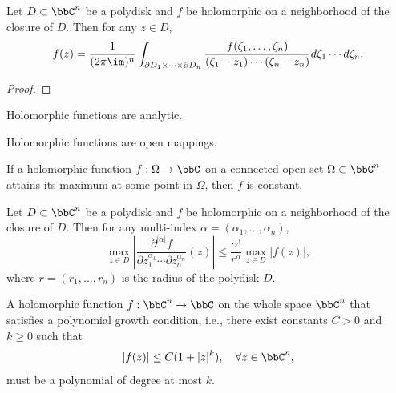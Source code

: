 \begin{theorem}\label{thm:Cauchy_Integral_Formula_in_several_complex_variables}
	Let \(D \subset \bbC^n\) be a polydisk and \(f\) be holomorphic on a neighborhood of the closure of \(D\).
	Then for any \(z \in D\),
	\[ f(z) = \frac{1}{(2\pi \im)^n} \int_{\partial D_1 \times \cdots \times \partial D_n} \frac{f(\zeta_1, \ldots, \zeta_n)}{(\zeta_1 - z_1) \cdots (\zeta_n - z_n)} d\zeta_1 \cdots d\zeta_n. \]
\end{theorem}
\begin{proof}
\end{proof}

\begin{corollary}\label{cor:holomorphic_functions_are_analytic}
	Holomorphic functions are analytic.
\end{corollary}

\begin{proposition}\label{prop:open_mapping_theorem}
	Holomorphic functions are open mappings.
\end{proposition}

\begin{proposition}\label{prop:rigidity_of_holomorphic_functions}
	If a holomorphic function \(f: \Omega \to \bbC\) on a connected open set \(\Omega \subset \bbC^n\) attains its maximum at some point in \(\Omega\), then \(f\) is constant.
\end{proposition}

\begin{lemma}\label{prop:Cauchy_estimates}
	Let \(D \subset \bbC^n\) be a polydisk and \(f\) be holomorphic on a neighborhood of the closure of \(D\). Then for any multi-index \(\alpha = (\alpha_1, \ldots, \alpha_n)\),
	\[ \max_{z \in D} \left| \frac{\partial^{|\alpha|} f}{\partial z_1^{\alpha_1} \cdots \partial z_n^{\alpha_n}}(z) \right| \leq \frac{\alpha!}{r^\alpha} \max_{z \in D} |f(z)|, \]
	where \(r = (r_1, \ldots, r_n)\) is the radius of the polydisk \(D\).
\end{lemma}

\begin{theorem}\label{thm:generalized_Liouville_Theorem}
	A holomorphic function \(f: \bbC^n \to \bbC\) on the whole space \(\bbC^n\) that satisfies a polynomial growth condition, i.e., there exist constants \(C > 0\) and \(k \geq 0\) such that
	\[ |f(z)| \leq C(1 + |z|^k), \quad \forall z \in \bbC^n, \]
	must be a polynomial of degree at most \(k\).
\end{theorem}


